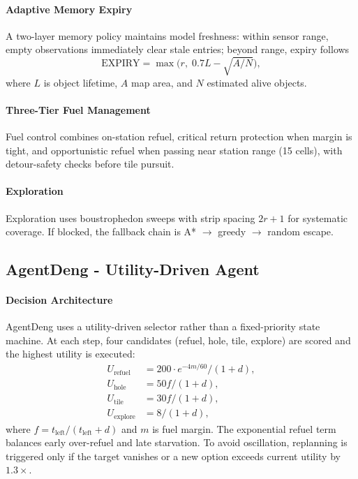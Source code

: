 \documentclass{article}
\begin{document}
\paragraph{Adaptive Memory Expiry}
A two-layer memory policy maintains model freshness:
within sensor range, empty observations immediately clear stale entries; beyond range, expiry follows
\[
\text{EXPIRY} = \max\!\big(r,\; 0.7L - \sqrt{A/N}\big),
\]
where \(L\) is object lifetime, \(A\) map area, and \(N\) estimated alive objects.

\paragraph{Three-Tier Fuel Management}
Fuel control combines on-station refuel, critical return protection when margin is tight, and opportunistic refuel when passing near station range (15 cells), with detour-safety checks before tile pursuit.

\paragraph{Exploration}
Exploration uses boustrophedon sweeps with strip spacing \(2r+1\) for systematic coverage.
If blocked, the fallback chain is A* \(\rightarrow\) greedy \(\rightarrow\) random escape.


\subsection{AgentDeng - Utility-Driven Agent}

\paragraph{Decision Architecture} 
AgentDeng uses a utility-driven selector rather than a fixed-priority state machine.
At each step, four candidates (refuel, hole, tile, explore) are scored and the highest utility is executed:
\begin{align*}
  U_{\text{refuel}}  &= 200 \cdot e^{-4m/60}/(1+d), \\
  U_{\text{hole}}    &= 50f/(1+d), \\
  U_{\text{tile}}    &= 30f/(1+d), \\
  U_{\text{explore}} &= 8/(1+d),
  \end{align*}
where \(f = t_{\text{left}}/(t_{\text{left}}+d)\) and \(m\) is fuel margin.
The exponential refuel term balances early over-refuel and late starvation.
To avoid oscillation, replanning is triggered only if the target vanishes or a new option exceeds current utility by \(1.3\times\).
\end{document}
